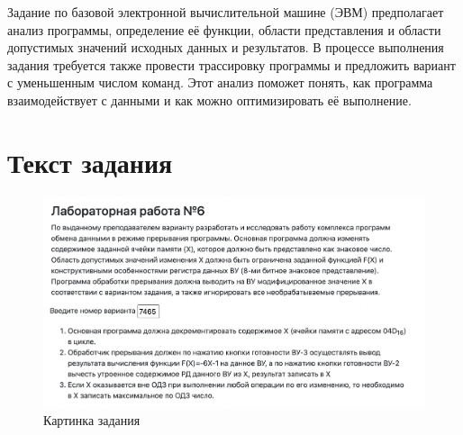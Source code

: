 \documentclass[14pt]{extreport}
\begin{document}
    \pagestyle{empty} %
    

    \pagestyle{plain} %
    \tableofcontents
    \intro Задание по базовой электронной вычислительной машине (ЭВМ) предполагает анализ программы, определение её функции, области представления и области допустимых значений исходных данных и результатов. В процессе выполнения задания требуется также провести трассировку программы и предложить вариант с уменьшенным числом команд. Этот анализ поможет понять, как программа взаимодействует с данными и как можно оптимизировать её выполнение.

    \chapter{Текст задания}


        \begin{figure}[!h]
            \centering
            \includegraphics[width=0.8\linewidth]{task.png}
            \caption{Картинка задания}

        \end{figure}
\end{document}
